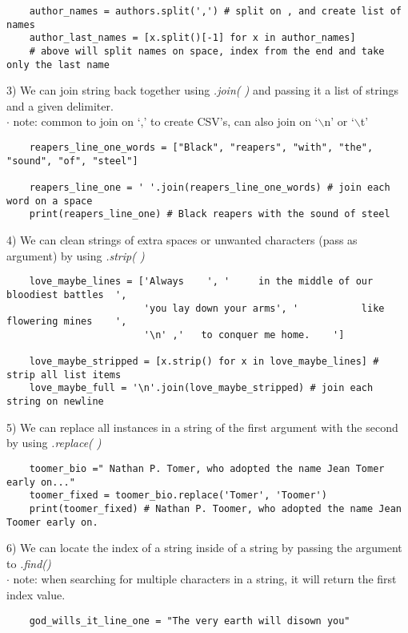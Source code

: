 \documentclass[11pt, a4paper]{article}
\begin{document}
\begin{spacing}{1.1}
\begin{lstlisting}
	author_names = authors.split(',') # split on , and create list of names
	author_last_names = [x.split()[-1] for x in author_names] 
	# above will split names on space, index from the end and take only the last name \end{lstlisting}\vspace*{1mm}
	\hspace*{1.5mm} 3) We can join string back together using \textit{.join( )} and passing it a list of strings and a given delimiter. \\
	\hspace*{6mm} $\cdot$ note: common to join on `,' to create CSV's, can also join on `$\backslash$n' or `$\backslash$t' 
	\begin{lstlisting}
	reapers_line_one_words = ["Black", "reapers", "with", "the", "sound", "of", "steel"]
	
	reapers_line_one = ' '.join(reapers_line_one_words) # join each word on a space
	print(reapers_line_one) # Black reapers with the sound of steel	\end{lstlisting}\vspace*{1mm}
	\hspace*{1.5mm} 4) We can clean strings of extra spaces or unwanted characters (pass as argument) by using \textit{.strip( )}  
	\begin{lstlisting}
	love_maybe_lines = ['Always    ', '     in the middle of our bloodiest battles  ', 
	                    'you lay down your arms', '           like flowering mines    ',
	                    '\n' ,'   to conquer me home.    ']
	
	love_maybe_stripped = [x.strip() for x in love_maybe_lines] # strip all list items
	love_maybe_full = '\n'.join(love_maybe_stripped) # join each string on newline \end{lstlisting} \newpage
	\noindent \hspace*{1.5mm} 5) We can replace all instances in a string of the first argument with the second by using \textit{.replace( )}
	\begin{lstlisting}
	toomer_bio =" Nathan P. Tomer, who adopted the name Jean Tomer early on..."
	toomer_fixed = toomer_bio.replace('Tomer', 'Toomer')
	print(toomer_fixed) # Nathan P. Toomer, who adopted the name Jean Toomer early on.	\end{lstlisting}\vspace*{1mm}
	\hspace*{1.5mm} 6) We can locate the index of a string inside of a string by passing the argument to \textit{.find()} \\
	\hspace*{6mm} $\cdot$ note: when searching for multiple characters in a string, it will return the first index value.
	\begin{lstlisting}
	god_wills_it_line_one = "The very earth will disown you"
	

\end{lstlisting}
\end{spacing}
\end{document}
